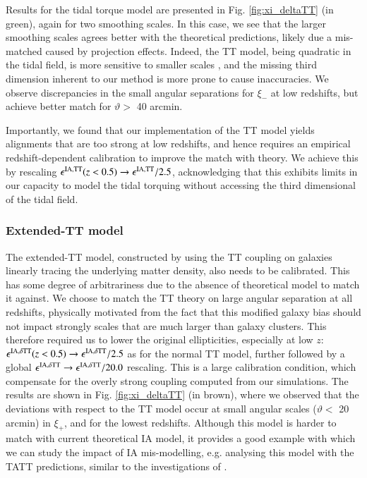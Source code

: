 Results for the tidal torque model are presented in Fig. \ref{fig:xi_deltaTT} (in green), again for two smoothing scales. In this case, we see that the larger smoothing scales agrees better with the theoretical predictions, likely due a mis-matched caused by projection effects. Indeed, the TT model, being quadratic in the tidal field, is more sensitive to smaller scales \citep{TATT}, and the missing third dimension inherent to our method is more prone to cause inaccuracies. We observe discrepancies in the small angular separations for  $\xi_-$ at low redshifts, but achieve better match for $\vartheta>$  40 arcmin.

Importantly, we found that our implementation of the TT model yields alignments that are too strong at low redshifts, and hence requires an empirical redshift-dependent calibration to improve the match with theory. We achieve this by rescaling $\epsilon^{\rm IA, TT}(z<0.5) \rightarrow \epsilon^{\rm IA, TT} /2.5$, acknowledging that this exhibits limits in our capacity to model the tidal torquing without accessing the third dimensional of the tidal field. 

%





\subsubsection*{Extended-TT model}
\label{subsec:TT}

The extended-TT model, constructed by using the TT coupling on galaxies linearly tracing the underlying matter density, also needs to be calibrated. This has some degree of arbitrariness due to the absence of theoretical model to match it against. We choose to match the TT theory on large angular separation at all redshifts, physically motivated from the fact that this modified galaxy bias should not impact strongly scales that are much larger than galaxy clusters.
This therefore required us to lower the original ellipticities, especially at low $z$: $\epsilon^{{\rm IA}, \delta{\rm TT}}(z<0.5) \rightarrow \epsilon^{{\rm IA}, \delta{\rm TT}} /2.5$ as for the normal TT model, further followed by a global $\epsilon^{{\rm IA}, \delta{\rm TT}} \rightarrow \epsilon^{{\rm IA}, \delta{\rm TT}}/20.0$ rescaling. This is a large calibration condition, which compensate for the overly strong coupling computed from our simulations. The results are shown in Fig. \ref{fig:xi_deltaTT} (in brown), where we observed that the deviations with respect to the TT model occur at small angular scales ($\vartheta < $ 20 arcmin) in $\xi_+$, and for the lowest redshifts. Although this model is harder to match with current theoretical IA model, it provides a good example with which we can study the impact of IA mis-modelling, e.g. analysing this model with the TATT predictions, similar to the investigations of \citet{Paopiamsap2024}.


